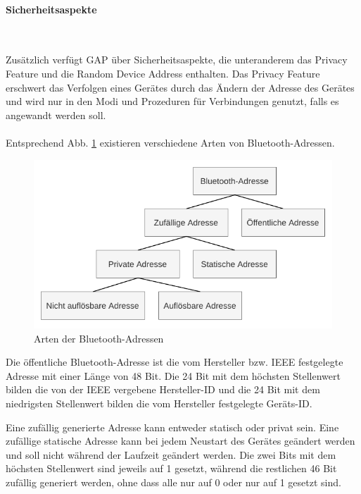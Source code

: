 \paragraph{Sicherheitsaspekte} \mbox{} \vspace{0.2cm} \\
\label{sec: gap sicherheit}

Zusätzlich verfügt GAP über Sicherheitsaspekte, die unteranderem das Privacy Feature und die Random Device Address enthalten. Das Privacy Feature erschwert das Verfolgen eines Gerätes durch das Ändern der Adresse des Gerätes und wird nur in den Modi und Prozeduren für Verbindungen genutzt, falls es angewandt werden soll.\\\\

Entsprechend Abb. \ref{fig: bt adressen arten} existieren verschiedene Arten von Bluetooth-Adressen.

\begin{figure}[hbt!]
    \centering
    \includegraphics{graphics/BT_Adressen_Baum.pdf}
    \caption{Arten der Bluetooth-Adressen}
    \label{fig: bt adressen arten}
\end{figure}

Die öffentliche Bluetooth-Adresse ist die vom Hersteller bzw. IEEE festgelegte Adresse mit einer Länge von 48 Bit. Die 24 Bit mit dem höchsten Stellenwert bilden die von der IEEE vergebene Hersteller-ID und die 24 Bit mit dem niedrigsten Stellenwert bilden die vom Hersteller festgelegte Geräts-ID. \cite{BtSpec4.2_2576}

Eine zufällig generierte Adresse kann entweder statisch oder privat sein. Eine zufällige statische Adresse kann bei jedem Neustart des Gerätes geändert werden und soll nicht während der Laufzeit geändert werden. Die zwei Bits mit dem höchsten Stellenwert sind jeweils auf 1 gesetzt, während die restlichen 46 Bit zufällig generiert werden, ohne dass alle nur auf 0 oder nur auf 1 gesetzt sind.

